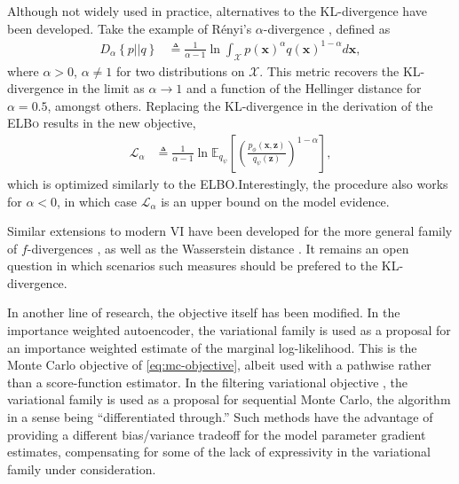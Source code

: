 Although not widely used in practice, alternatives to the KL-divergence have been developed. Take the example of R\'enyi's $\alpha$-divergence \citep{LiTurner2016}, defined as
\begin{align*}
	D_\alpha\left\{p||q\right\} &\triangleq \frac{1}{\alpha-1}\ln\int_\mathcal{X}p(\mathbf{x})^\alpha q(\mathbf{x})^{1-\alpha}d\mathbf{x},
\end{align*}
where $\alpha>0$, $\alpha\neq1$ for two distributions on $\mathcal{X}$. This metric recovers the KL-divergence in the limit as $\alpha\rightarrow1$ and a function of the Hellinger distance for $\alpha=0.5$, amongst others. Replacing the KL-divergence in the derivation of the {\scshape ELBo} results in the new objective,
\begin{align*}
	\mathcal{L}_\alpha &\triangleq \frac{1}{\alpha-1}\ln\mathbb{E}_{q_\psi}\left[\left(\frac{p_\phi(\mathbf{x},\mathbf{z})}{q_\psi(\mathbf{z})}\right)^{1-\alpha}\right], 
\end{align*}
which is optimized similarly to the ELBO.Interestingly, the procedure also works for $\alpha<0$, in which case $\mathcal{L}_\alpha$ is an upper bound on the model evidence.

Similar extensions to modern VI have been developed for the more general family of $f$-divergences \citep{bamler2017perturbative}, as well as the Wasserstein distance \citep{ranganath2016operator, liu2016stein}. It remains an open question in which scenarios such measures should be prefered to the KL-divergence.

In another line of research, the objective itself has been modified. In the importance weighted autoencoder, the variational family is used as a proposal for an importance weighted estimate of the marginal log-likelihood. This is the Monte Carlo objective of \eqref{eq:mc-objective}, albeit used with a pathwise rather than a score-function estimator. In the filtering variational objective \citep{MaddisonEtAl2017, LeEtAl2017, NaessethEtAl2017}, the variational family is used as a proposal for sequential Monte Carlo, the algorithm in a sense being ``differentiated through.'' Such methods have the advantage of providing a different bias/variance tradeoff for the model parameter gradient estimates, compensating for some of the lack of expressivity in the variational family under consideration.

